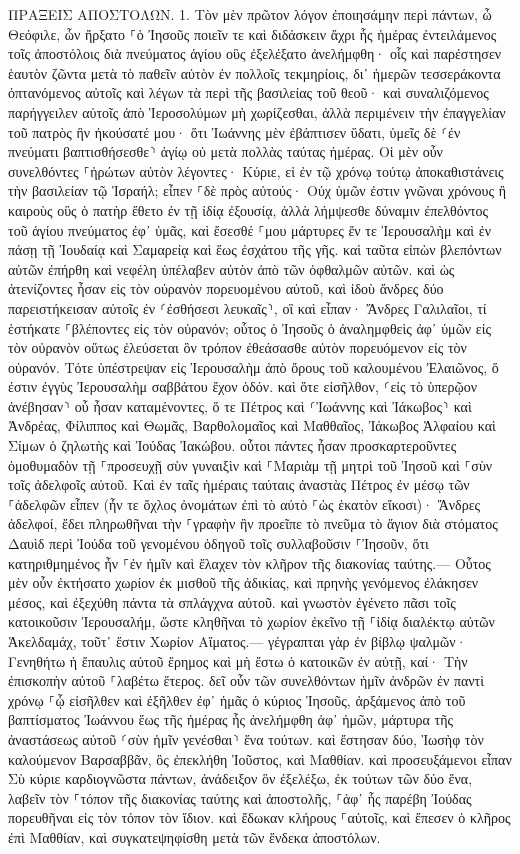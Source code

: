 \documentclass[twoside, 9pt]{extreport}
\begin{document}
ΠΡΑΞΕΙΣ ΑΠΟΣΤΟΛΩΝ.
1.
Τὸν μὲν πρῶτον λόγον ἐποιησάμην περὶ πάντων, ὦ Θεόφιλε, ὧν ἤρξατο ⸀ὁ Ἰησοῦς ποιεῖν τε καὶ διδάσκειν 
ἄχρι ἧς ἡμέρας ἐντειλάμενος τοῖς ἀποστόλοις διὰ πνεύματος ἁγίου οὓς ἐξελέξατο ἀνελήμφθη· 
οἷς καὶ παρέστησεν ἑαυτὸν ζῶντα μετὰ τὸ παθεῖν αὐτὸν ἐν πολλοῖς τεκμηρίοις, δι᾽ ἡμερῶν τεσσεράκοντα ὀπτανόμενος αὐτοῖς καὶ λέγων τὰ περὶ τῆς βασιλείας τοῦ θεοῦ· 
καὶ συναλιζόμενος παρήγγειλεν αὐτοῖς ἀπὸ Ἱεροσολύμων μὴ χωρίζεσθαι, ἀλλὰ περιμένειν τὴν ἐπαγγελίαν τοῦ πατρὸς ἣν ἠκούσατέ μου· 
ὅτι Ἰωάννης μὲν ἐβάπτισεν ὕδατι, ὑμεῖς δὲ ⸂ἐν πνεύματι βαπτισθήσεσθε⸃ ἁγίῳ οὐ μετὰ πολλὰς ταύτας ἡμέρας. 
Οἱ μὲν οὖν συνελθόντες ⸀ἠρώτων αὐτὸν λέγοντες· Κύριε, εἰ ἐν τῷ χρόνῳ τούτῳ ἀποκαθιστάνεις τὴν βασιλείαν τῷ Ἰσραήλ; 
εἶπεν ⸀δὲ πρὸς αὐτούς· Οὐχ ὑμῶν ἐστιν γνῶναι χρόνους ἢ καιροὺς οὓς ὁ πατὴρ ἔθετο ἐν τῇ ἰδίᾳ ἐξουσίᾳ, 
ἀλλὰ λήμψεσθε δύναμιν ἐπελθόντος τοῦ ἁγίου πνεύματος ἐφ᾽ ὑμᾶς, καὶ ἔσεσθέ ⸀μου μάρτυρες ἔν τε Ἰερουσαλὴμ καὶ ἐν πάσῃ τῇ Ἰουδαίᾳ καὶ Σαμαρείᾳ καὶ ἕως ἐσχάτου τῆς γῆς. 
καὶ ταῦτα εἰπὼν βλεπόντων αὐτῶν ἐπήρθη καὶ νεφέλη ὑπέλαβεν αὐτὸν ἀπὸ τῶν ὀφθαλμῶν αὐτῶν. 
καὶ ὡς ἀτενίζοντες ἦσαν εἰς τὸν οὐρανὸν πορευομένου αὐτοῦ, καὶ ἰδοὺ ἄνδρες δύο παρειστήκεισαν αὐτοῖς ἐν ⸂ἐσθήσεσι λευκαῖς⸃, 
οἳ καὶ εἶπαν· Ἄνδρες Γαλιλαῖοι, τί ἑστήκατε ⸀βλέποντες εἰς τὸν οὐρανόν; οὗτος ὁ Ἰησοῦς ὁ ἀναλημφθεὶς ἀφ᾽ ὑμῶν εἰς τὸν οὐρανὸν οὕτως ἐλεύσεται ὃν τρόπον ἐθεάσασθε αὐτὸν πορευόμενον εἰς τὸν οὐρανόν. 
Τότε ὑπέστρεψαν εἰς Ἰερουσαλὴμ ἀπὸ ὄρους τοῦ καλουμένου Ἐλαιῶνος, ὅ ἐστιν ἐγγὺς Ἰερουσαλὴμ σαββάτου ἔχον ὁδόν. 
καὶ ὅτε εἰσῆλθον, ⸂εἰς τὸ ὑπερῷον ἀνέβησαν⸃ οὗ ἦσαν καταμένοντες, ὅ τε Πέτρος καὶ ⸂Ἰωάννης καὶ Ἰάκωβος⸃ καὶ Ἀνδρέας, Φίλιππος καὶ Θωμᾶς, Βαρθολομαῖος καὶ Μαθθαῖος, Ἰάκωβος Ἁλφαίου καὶ Σίμων ὁ ζηλωτὴς καὶ Ἰούδας Ἰακώβου. 
οὗτοι πάντες ἦσαν προσκαρτεροῦντες ὁμοθυμαδὸν τῇ ⸀προσευχῇ σὺν γυναιξὶν καὶ ⸀Μαριὰμ τῇ μητρὶ τοῦ Ἰησοῦ καὶ ⸀σὺν τοῖς ἀδελφοῖς αὐτοῦ. 
Καὶ ἐν ταῖς ἡμέραις ταύταις ἀναστὰς Πέτρος ἐν μέσῳ τῶν ⸀ἀδελφῶν εἶπεν (ἦν τε ὄχλος ὀνομάτων ἐπὶ τὸ αὐτὸ ⸀ὡς ἑκατὸν εἴκοσι)· 
Ἄνδρες ἀδελφοί, ἔδει πληρωθῆναι τὴν ⸀γραφὴν ἣν προεῖπε τὸ πνεῦμα τὸ ἅγιον διὰ στόματος Δαυὶδ περὶ Ἰούδα τοῦ γενομένου ὁδηγοῦ τοῖς συλλαβοῦσιν ⸀Ἰησοῦν, 
ὅτι κατηριθμημένος ἦν ⸀ἐν ἡμῖν καὶ ἔλαχεν τὸν κλῆρον τῆς διακονίας ταύτης.— 
Οὗτος μὲν οὖν ἐκτήσατο χωρίον ἐκ μισθοῦ τῆς ἀδικίας, καὶ πρηνὴς γενόμενος ἐλάκησεν μέσος, καὶ ἐξεχύθη πάντα τὰ σπλάγχνα αὐτοῦ. 
καὶ γνωστὸν ἐγένετο πᾶσι τοῖς κατοικοῦσιν Ἰερουσαλήμ, ὥστε κληθῆναι τὸ χωρίον ἐκεῖνο τῇ ⸀ἰδίᾳ διαλέκτῳ αὐτῶν Ἁκελδαμάχ, τοῦτ᾽ ἔστιν Χωρίον Αἵματος.— 
γέγραπται γὰρ ἐν βίβλῳ ψαλμῶν· Γενηθήτω ἡ ἔπαυλις αὐτοῦ ἔρημος καὶ μὴ ἔστω ὁ κατοικῶν ἐν αὐτῇ, καί· Τὴν ἐπισκοπὴν αὐτοῦ ⸀λαβέτω ἕτερος. 
δεῖ οὖν τῶν συνελθόντων ἡμῖν ἀνδρῶν ἐν παντὶ χρόνῳ ⸀ᾧ εἰσῆλθεν καὶ ἐξῆλθεν ἐφ᾽ ἡμᾶς ὁ κύριος Ἰησοῦς, 
ἀρξάμενος ἀπὸ τοῦ βαπτίσματος Ἰωάννου ἕως τῆς ἡμέρας ἧς ἀνελήμφθη ἀφ᾽ ἡμῶν, μάρτυρα τῆς ἀναστάσεως αὐτοῦ ⸂σὺν ἡμῖν γενέσθαι⸃ ἕνα τούτων. 
καὶ ἔστησαν δύο, Ἰωσὴφ τὸν καλούμενον Βαρσαββᾶν, ὃς ἐπεκλήθη Ἰοῦστος, καὶ Μαθθίαν. 
καὶ προσευξάμενοι εἶπαν Σὺ κύριε καρδιογνῶστα πάντων, ἀνάδειξον ὃν ἐξελέξω, ἐκ τούτων τῶν δύο ἕνα, 
λαβεῖν τὸν ⸀τόπον τῆς διακονίας ταύτης καὶ ἀποστολῆς, ⸀ἀφ᾽ ἧς παρέβη Ἰούδας πορευθῆναι εἰς τὸν τόπον τὸν ἴδιον. 
καὶ ἔδωκαν κλήρους ⸀αὐτοῖς, καὶ ἔπεσεν ὁ κλῆρος ἐπὶ Μαθθίαν, καὶ συγκατεψηφίσθη μετὰ τῶν ἕνδεκα ἀποστόλων. 
\end{document}
